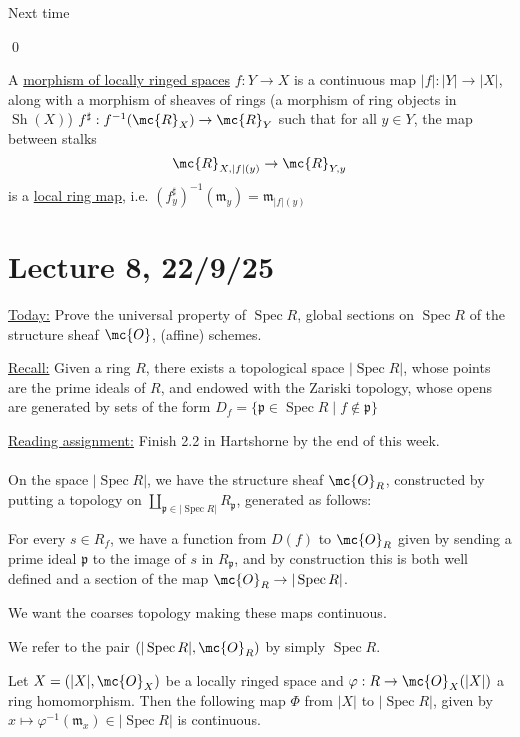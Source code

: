 \documentclass[x11names,reqno,14pt]{extarticle}
\newcommand{\mk}[1]{\mathfrak{#1}}
\DeclareMathOperator{\Spec}{Spec}
\DeclareMathOperator{\Sh}{Sh}
\begin{document}
\proof

Next time

\qed


A \underline{morphism of locally ringed spaces} $f:Y\to X$ is a continuous map $|f|:|Y|\to|X|$, along with a morphism of sheaves of rings (a morphism of ring objects in $\Sh(X)$) $f^\sharp: f^{-1}(\mc{R}_X)\to\mc{R}_Y$ such that for all $y \in Y$, the map between stalks 
\[
\mc{R}_{X,|f|(y)}\to\mc{R}_{Y,y}
\]
is a \underline{local ring map}, i.e. $(f^\sharp_y)^{-1}(\mk{m}_y)= \mk{m}_{|f|(y)}$

\section*{Lecture 8, 22/9/25}

\underline{Today:} Prove the universal property of $\Spec R$, global sections on $\Spec R$ of the structure sheaf $\mc{O}$, (affine) schemes. 

\underline{Recall:} Given a ring $R$, there exists a topological space $|\Spec R|$, whose points are the prime ideals of $R$, and endowed with the Zariski topology, whose opens are generated by sets of the form $D_f = \{\mk{p} \in \Spec R \mid f \not\in \mk{p}\}$

\underline{Reading assignment:} Finish 2.2 in Hartshorne by the end of this week. 

\paragraph{}

On the space $|\Spec R|$, we have the structure sheaf $\mc{O}_R$, constructed by putting a topology on $\coprod_{\mk{p}\in|\Spec R|}R_{\mk{p}}$,  generated as follows:

For every $s \in R_f$, we have a function from $D(f)$ to $\mc{O}_R$ given by sending a prime ideal $\mk{p}$ to the image of $s$ in $R_{\mk{p}}$, and by construction this is both well defined and a section of the map $\mc{O}_R\to |\Spec R|$. 

We want the coarses topology making these maps continuous. 

We refer to the pair $(|\Spec R|, \mc{O}_R)$ by simply $\Spec R$. 

\lem

Let $X = (|X|, \mc{O}_X)$ be a locally ringed space and $\varphi:R\to\mc{O}_X(|X|)$ a ring homomorphism. Then the following map $\Phi$ from $|X|$ to $|\Spec R|$, given by $x\mapsto \varphi^{-1}(\mk{m}_x) \in |\Spec R|$ is continuous. 
\end{document}
